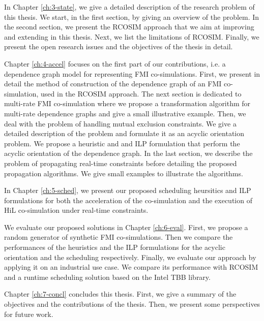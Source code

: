 In Chapter \ref{ch:3-state}, we give a detailed description of the research problem of this thesis. We start, in the first section, by giving an overview of the problem. In the second section, we present the RCOSIM approach that we aim at improving and extending in this thesis. Next, we list the limitations of RCOSIM. Finally, we present the open research issues and the objectives of the thesis in detail.

Chapter \ref{ch:4-accel} focuses on the first part of our contributions, i.e. a dependence graph model for representing FMI co-simulations. First, we present in detail the method of construction of the dependence graph of an FMI co-simulation, used in the RCOSIM approach. The next section is dedicated to multi-rate FMI co-simulation where we propose a transformation algorithm for multi-rate dependence graphs and give a small illustrative example. Then, we deal with the problem of handling mutual exclusion constraints. We give a detailed description of the problem and formulate it as an acyclic orientation problem. We propose a heuristic and and ILP formulation that perform the acyclic orientation of the dependence graph. In the last section, we describe the problem of propagating real-time constraints before detailing the proposed propagation algorithms. We give small examples to illustrate the algorithms.

In Chapter \ref{ch:5-sched}, we present our proposed scheduling heursitics and ILP formulations for both the acceleration of the co-simulation and the execution of HiL co-simulation under real-time constraints.

We evaluate our proposed solutions in Chapter \ref{ch:6-eval}. First, we propose a random generator of synthetic FMI co-simulations. Then we compare the performances of the heuristics and the ILP formulations for the acyclic orientation and the scheduling respectively. Finally, we evaluate our approach by applying it on an industrial use case. We compare its performance with RCOSIM and a runtime scheduling solution based on the Intel TBB library.

Chapter \ref{ch:7-concl} concludes this thesis. First, we give a summary of the objectives and the contributions of the thesis. Then, we present some perspectives for future work. 
